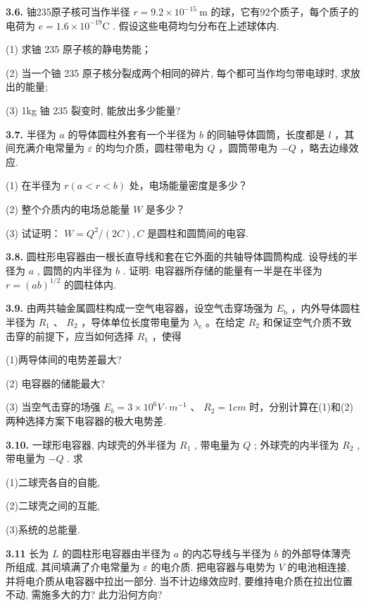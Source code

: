 \vfill

\textbf{3.6.} 铀235原子核可当作半径 $r = 9.2 \times 10^{-15} \mathrm{~m}$ 的球，它有92个质子，每个质子的电荷为 $e = 1.6 \times 10^{-19} \mathrm{C}$ . 假设这些电荷均匀分布在上述球体内.

(1) 求铀 235 原子核的静电势能；

(2) 当一个铀 235 原子核分裂成两个相同的碎片, 每个都可当作均匀带电球时, 求放出的能量;

(3) 1kg 铀 235 裂变时, 能放出多少能量?

\vfill

\newpage

\textbf{3.7.} 半径为 $a$ 的导体圆柱外套有一个半径为 $b$ 的同轴导体圆筒，长度都是 $l$ ，其间充满介电常量为 $\varepsilon$ 的均匀介质，圆柱带电为 $Q$ ，圆筒带电为 $-Q$ ，略去边缘效应.

(1) 在半径为 $r(a < r < b)$ 处，电场能量密度是多少？

(2) 整个介质内的电场总能量 $W$ 是多少？

(3) 试证明： $W = Q^2 / (2C), C$ 是圆柱和圆筒间的电容.

\vfill

\textbf{3.8.} 圆柱形电容器由一根长直导线和套在它外面的共轴导体圆筒构成. 设导线的半径为 $a$ , 圆筒的内半径为 $b$ . 证明: 电容器所存储的能量有一半是在半径为 $r = (ab)^{1/2}$ 的圆柱体内.

\vfill

\newpage

\textbf{3.9.} 由两共轴金属圆柱构成一空气电容器，设空气击穿场强为 $E_{\mathrm{b}}$ ，内外导体圆柱半径为 $R_{1}$ 、 $R_{2}$ ，导体单位长度带电量为 $\lambda_{\mathrm{e}}$ 。在给定 $R_{2}$ 和保证空气介质不致击穿的前提下，应当如何选择 $R_{1}$ ，使得

(1)两导体间的电势差最大?

(2) 电容器的储能最大?

(3) 当空气击穿的场强 $E_{b}=3\times10^{6}V\cdot m^{-1}$ 、 $R_{2}=1cm$ 时，分别计算在(1)和(2)两种选择方案下电容器的极大电势差.

\vfill

\textbf{3.10.} 一球形电容器, 内球壳的外半径为 $R_{1}$ , 带电量为 $Q$ ; 外球壳的内半径为 $R_{2}$ , 带电量为 $-Q$ . 求

(1)二球壳各自的自能, 

(2)二球壳之间的互能, 

(3)系统的总能量.

\vfill

\newpage

\textbf{3.11} 长为 $L$ 的圆柱形电容器由半径为 $a$ 的内芯导线与半径为 $b$ 的外部导体薄壳所组成, 其间填满了介电常量为 $\varepsilon$ 的电介质. 把电容器与电势为 $V$ 的电池相连接, 并将电介质从电容器中拉出一部分. 当不计边缘效应时, 要维持电介质在拉出位置不动, 需施多大的力? 此力沿何方向?


